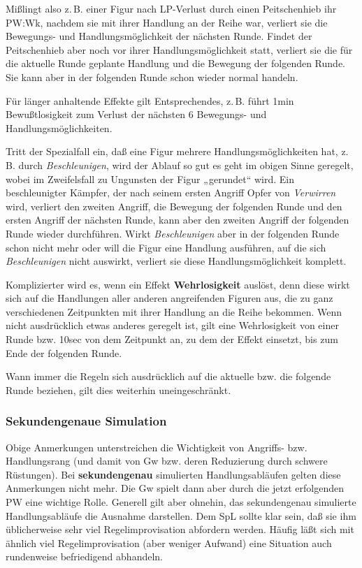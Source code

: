 \documentclass[10pt,a4paper,germanpar]{article}
\begin{document}
Mißlingt also z.\,B. einer Figur nach LP-Verlust durch einen
Peitschenhieb ihr PW:Wk, nachdem sie mit ihrer Handlung an der Reihe
war, verliert sie die Bewegungs- und Handlungsmöglichkeit der nächsten
Runde. Findet der Peitschenhieb aber noch vor ihrer
Handlungsmöglichkeit statt, verliert sie die für die aktuelle Runde
geplante Handlung und die Bewegung der folgenden Runde. Sie kann aber
in der folgenden Runde schon wieder normal handeln.

Für länger anhaltende Effekte gilt Entsprechendes, z.\,B. führt 1min
Bewußtlosigkeit zum Verlust der nächsten 6 Bewegungs- und
Handlungsmöglichkeiten.

Tritt der Spezialfall ein, daß eine Figur mehrere
Handlungsmöglichkeiten hat, z.\,B. durch \emph{Beschleunigen}, wird
der Ablauf so gut es geht im obigen Sinne geregelt, wobei im
Zweifelsfall zu Ungunsten der Figur „gerundet“ wird. Ein
beschleunigter Kämpfer, der nach seinem ersten Angriff Opfer von
\emph{Verwirren} wird, verliert den zweiten Angriff, die Bewegung der
folgenden Runde und den ersten Angriff der nächsten Runde, kann aber
den zweiten Angriff der folgenden Runde wieder durchführen. Wirkt
\emph{Beschleunigen} aber in der folgenden Runde schon nicht mehr oder
will die Figur eine Handlung ausführen, auf die sich
\emph{Beschleunigen} nicht auswirkt, verliert sie diese
Handlungsmöglichkeit komplett.

Komplizierter wird es, wenn ein Effekt \textbf{Wehrlosigkeit} auslöst,
denn diese wirkt sich auf die Handlungen aller anderen angreifenden
Figuren aus, die zu ganz verschiedenen Zeitpunkten mit ihrer Handlung
an die Reihe bekommen. Wenn nicht ausdrücklich etwas anderes geregelt
ist, gilt eine Wehrlosigkeit von einer Runde bzw. 10sec von dem
Zeitpunkt an, zu dem der Effekt einsetzt, bis zum Ende der folgenden
Runde.

Wann immer die Regeln sich ausdrücklich auf die aktuelle bzw. die
folgende Runde beziehen, gilt dies weiterhin uneingeschränkt.

\subsubsection{Sekundengenaue Simulation}

Obige Anmerkungen unterstreichen die Wichtigkeit von Angriffs-
bzw. Handlungsrang (und damit von Gw bzw. deren Reduzierung durch
schwere Rüstungen). Bei \textbf{sekundengenau} simulierten
Handlungsabläufen gelten diese Anmerkungen nicht mehr. Die Gw spielt
dann aber durch die jetzt erfolgenden PW eine wichtige Rolle. Generell
gilt aber ohnehin, das sekundengenau simulierte Handlungsabläufe die
Ausnahme darstellen. Dem SpL sollte klar sein, daß sie ihm
üblicherweise sehr viel Regelimprovisation abfordern werden. Häufig
läßt sich mit ähnlich viel Regelimprovisation (aber weniger Aufwand)
eine Situation auch rundenweise befriedigend abhandeln.
\end{document}
